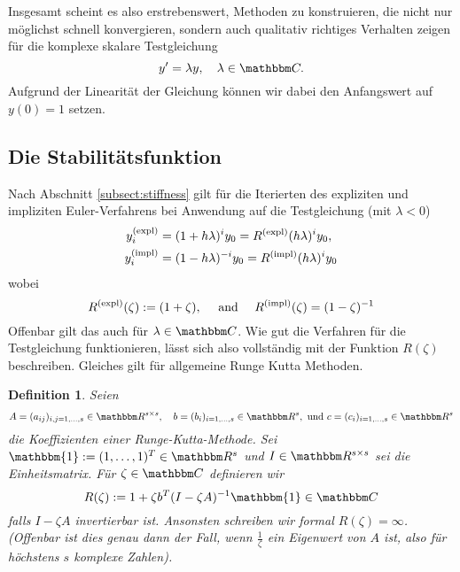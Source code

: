 \documentclass[12pt,a4paper]{book}
\theoremstyle{break}
\newtheorem{definition}[theorem]{Definition}
\theoremstyle{nonumberplain}
\newcommand{\C}{\mathbbm C}
\newcommand{\R}{\mathbbm R}
\newcommand{\1}{\mathbbm{1}} 			      	%
\begin{document}
Insgesamt scheint es also erstrebenswert, Methoden zu konstruieren, die nicht nur möglichst schnell konvergieren, sondern auch
qualitativ richtiges Verhalten zeigen für die komplexe skalare Testgleichung
\[
y'=\lambda y, \quad \lambda\in \C.
\] 
Aufgrund der Linearität der Gleichung können wir dabei den Anfangswert auf $y(0)=1$ setzen.



\subsection{Die Stabilitätsfunktion}

Nach Abschnitt \ref{subsect:stiffness} gilt für die Iterierten des expliziten und impliziten Euler-Verfahrens
bei Anwendung auf die Testgleichung (mit $\lambda<0$)
\begin{align*}
y_i^{\mbox{\scriptsize (expl)}}&=(1+h\lambda )^i y_0=R^{\mbox{\scriptsize (expl)}}(h\lambda)^i y_0,\\
y_i^{\mbox{\scriptsize (impl)}}&=(1-h\lambda )^{-i} y_0=R^{\mbox{\scriptsize (impl)}}(h\lambda)^i y_0
\end{align*}
wobei
\[
R^{\mbox{\scriptsize (expl)}}(\zeta):=(1+\zeta ), \quad \mbox{ and } \quad R^{\mbox{\scriptsize (impl)}}(\zeta)=(1-\zeta )^{-1}
\]
Offenbar gilt das auch für $\lambda\in \C$. Wie gut die Verfahren für die Testgleichung funktionieren, lässt sich also
vollständig mit der Funktion $R(\zeta)$ beschreiben. Gleiches gilt für allgemeine Runge Kutta Methoden.

\begin{definition}
Seien
\[
A=(a_{ij})_{i,j=1,\ldots,s}\in \R^{s\times s},\quad b=(b_i)_{i=1,\ldots,s}\in \R^s, \mbox{ und } c=(c_i)_{i=1,\ldots,s}\in \R^s
\]
die Koeffizienten einer Runge-Kutta-Methode. Sei
 $\1:=(1,\ldots,1)^T\in \R^s$ und $I\in \R^{s\times s}$ sei die Einheitsmatrix. Für $\zeta\in \C$ definieren wir
\[
R(\zeta):=1+\zeta b^T (I-\zeta A)^{-1} \1\in \C
\]
falls $I-\zeta A$ invertierbar ist. Ansonsten schreiben wir formal $R(\zeta)=\infty$.
(Offenbar ist dies genau dann der Fall, wenn $\frac{1}{\zeta}$ ein Eigenwert von $A$ ist,
also für höchstens $s$ komplexe Zahlen).
\end{definition}
\end{document}
